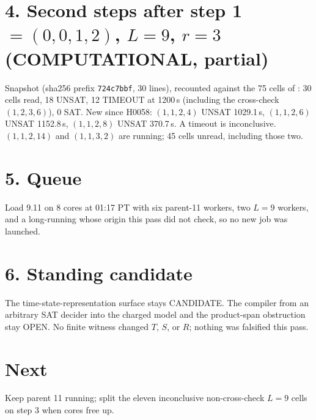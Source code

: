 \documentclass[11pt]{article}
\begin{document}
\section*{4. Second steps after step 1 $=(0,0,1,2)$, $L=9$, $r=3$ (COMPUTATIONAL, partial)}
Snapshot  (sha256 prefix \texttt{724c7bbf}, 30 lines), recounted against the 75 cells of : 30 cells read, 18 UNSAT, 12 TIMEOUT at 1200\,s (including the cross-check $(1,2,3,6)$), 0 SAT. New since H0058: $(1,1,2,4)$ UNSAT 1029.1\,s, $(1,1,2,6)$ UNSAT 1152.8\,s, $(1,1,2,8)$ UNSAT 370.7\,s. A timeout is inconclusive. $(1,1,2,14)$ and $(1,1,3,2)$ are running; 45 cells unread, including those two.

\section*{5. Queue}
Load 9.11 on 8 cores at 01:17 PT with six parent-11 workers, two $L=9$ workers, and a long-running  whose origin this pass did not check, so no new job was launched.

\section*{6. Standing candidate}
The time-state-representation surface stays CANDIDATE. The compiler from an arbitrary SAT decider into the charged model and the product-span obstruction stay OPEN. No finite witness changed $T$, $S$, or $R$; nothing was falsified this pass.

\section*{Next}
Keep parent 11 running; split the eleven inconclusive non-cross-check $L=9$ cells on step 3 when cores free up.
\end{document}
